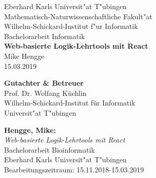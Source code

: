 \documentclass[twoside,12pt,a4paper]{report}
\begin{document}
 
\begin{titlepage}
 \begin{center}
  {\LARGE Eberhard Karls Universit"at T"ubingen}\\
  {\large Mathematisch-Naturwissenschaftliche Fakult"at \\
Wilhelm-Schickard-Institut f"ur Informatik\\[4cm]}
  {\huge Bachelorarbeit Informatik\\[2cm]}
  {\Large\bf Web-basierte Logik-Lehrtools mit React\\[1.5cm]}
 {\large Mike Hengge}\\[0.5cm]
15.03.2019\\[3cm]
\begin{center}{\small\bf Gutachter \& Betreuer}\\[0.5cm]
{\large Prof. Dr. Wolfang Küchlin}\\
  {\footnotesize Wilhelm-Schickard-Institut f\"ur Informatik\\
	Universit"at T"ubingen}	\end{center}
	
  \end{center}
\end{titlepage}


\thispagestyle{empty}
\vspace*{\fill}
\begin{minipage}{11.2cm}
\textbf{Hengge, Mike:}\\
\emph{Web-basierte Logik-Lehrtools mit React}\\ Bachelorarbeit Bioinformatik\\
Eberhard Karls Universit"at T"ubingen\\
Bearbeitungszeitraum: 15.11.2018-15.03.2019
\end{minipage}
\newpage


\setcounter{page}{1}

\end{document}
